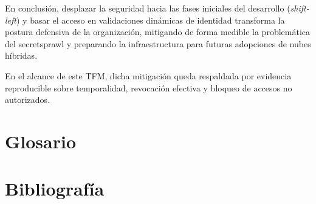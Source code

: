\documentclass[runningheads]{llncs}
\begin{document}
En conclusión, desplazar la seguridad hacia las fases iniciales del desarrollo (\textit{shift-left}) y basar el acceso en validaciones dinámicas de identidad transforma la postura defensiva de la organización, mitigando de forma medible la problemática del \gls{secretsprawl} y preparando la infraestructura para futuras adopciones de nubes híbridas.

En el alcance de este TFM, dicha mitigación queda respaldada por evidencia reproducible sobre temporalidad, revocación efectiva y bloqueo de accesos no autorizados.

\section{Glosario}
\glsaddall
\printglossaries

\newpage
\section{Bibliografía}
\printbibliography
\end{document}
